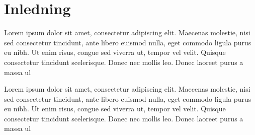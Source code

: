 \section{Inledning}

Lorem ipsum dolor sit amet, consectetur adipiscing elit. Maecenas molestie, nisi sed consectetur tincidunt, ante libero euismod nulla, eget commodo ligula purus eu nibh. Ut enim risus, congue sed viverra ut, tempor vel velit. Quisque consectetur tincidunt scelerisque. Donec nec mollis leo. Donec laoreet purus a massa ul

Lorem ipsum dolor sit amet, consectetur adipiscing elit. Maecenas molestie, nisi sed consectetur tincidunt, ante libero euismod nulla, eget commodo ligula purus eu nibh. Ut enim risus, congue sed viverra ut, tempor vel velit. Quisque consectetur tincidunt scelerisque. Donec nec mollis leo. Donec laoreet purus a massa ul

